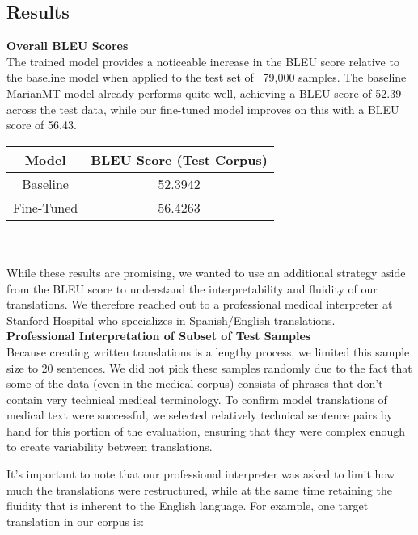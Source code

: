 \documentclass{article}
\begin{document}
\begin{multicols}{2}
\columnbreak

\section{Results}
\textbf{Overall BLEU Scores}\\
The trained model provides a noticeable increase in the BLEU score relative to the baseline model when applied to the test set of ~79,000 samples. The baseline MarianMT model already performs quite well, achieving a BLEU score of 52.39 across the test data, while our fine-tuned model improves on this with a BLEU score of 56.43.\\

\begingroup
\centering
\begin{tabular}{|c|c|}
\hline
Model & BLEU Score (Test Corpus) \\
\hline
\small{Baseline} & \small{52.3942} \\
\small{Fine-Tuned} & \small{56.4263} \\
\hline
\end{tabular}
\caption{\small{Table 2: Comparison of BLEU Scores}}
\label{table:ta}
\endgroup
\\
\\
While these results are promising, we wanted to use an additional strategy aside from the BLEU score to understand the interpretability and fluidity of our translations. We therefore reached out to a professional medical interpreter at Stanford Hospital who specializes in Spanish/English translations.\\

\textbf{Professional Interpretation of Subset of Test Samples}\\
Because creating written translations is a lengthy process, we limited this sample size to 20 sentences. We did not pick these samples randomly due to the fact that some of the data (even  in the medical corpus) consists of phrases that don’t contain very technical medical terminology. To confirm model translations of medical text were successful, we selected relatively technical sentence pairs by hand for this portion of the evaluation, ensuring that they were complex enough to create variability between translations.

It’s important to note that our professional interpreter was asked to limit how much the translations were restructured, while at the same time retaining the fluidity that is inherent to the English language. For example, one target translation in our corpus is:\\


\end{multicols}
\end{document}
